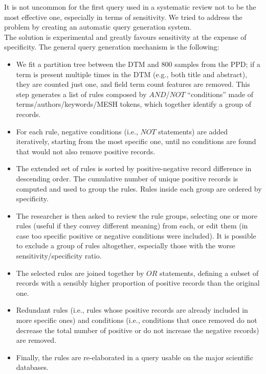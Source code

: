 \documentclass[
]{article}
\providecommand{\tightlist}{%
  \setlength{\itemsep}{0pt}\setlength{\parskip}{0pt}}
\begin{document}
It is not uncommon for the first query used in a systematic review not
to be the most effective one, especially in terms of sensitivity. We
tried to address the problem by creating an automatic query generation
system.\\
The solution is experimental and greatly favours sensitivity at the
expense of specificity. The general query generation mechanism is the
following:

\begin{itemize}
\tightlist
\item
  We fit a partition tree between the DTM and 800 samples from the PPD;
  if a term is present multiple times in the DTM (e.g., both title and
  abstract), they are counted just one, and field term count features
  are removed. This step generates a list of rules composed by
  \(AND\)/\(NOT\) ``conditions'' made of terms/authors/keywords/MESH
  tokens, which together identify a group of records.
\item
  For each rule, negative conditions (i.e., \(NOT\) statements) are
  added iteratively, starting from the most specific one, until no
  conditions are found that would not also remove positive records.
\item
  The extended set of rules is sorted by positive-negative record
  difference in descending order. The cumulative number of unique
  positive records is computed and used to group the rules. Rules inside
  each group are ordered by specificity.
\item
  The researcher is then asked to review the rule groups, selecting one
  or more rules (useful if they convey different meaning) from each, or
  edit them (in case too specific positive or negative conditions were
  included). It is possible to exclude a group of rules altogether,
  especially those with the worse sensitivity/specificity ratio.
\item
  The selected rules are joined together by \(OR\) statements, defining
  a subset of records with a sensibly higher proportion of positive
  records than the original one.
\item
  Redundant rules (i.e., rules whose positive records are already
  included in more specific ones) and conditions (i.e., conditions that
  once removed do not decrease the total number of positive or do not
  increase the negative records) are removed.
\item
  Finally, the rules are re-elaborated in a query usable on the major
  scientific databases.
\end{itemize}
\end{document}
